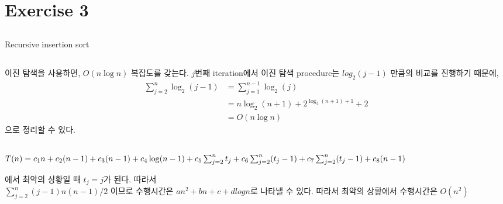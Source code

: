 \documentclass{article}
\begin{document}
\section{Exercise 3}
\subsection{}


\begin{algorithm}
	\caption{Recursive insertion sort}
	\begin{algorithmic}[1]
	     
                
                \EndWhile
            \EndFor
        \EndProcedure
	\end{algorithmic}
\end{algorithm}

\subsection{}
이진 탐색을 사용하면, $O(n \log n)$ 복잡도를 갖는다.
$j$번째 iteration에서 이진 탐색 procedure는 $log_2 (j-1)$ 만큼의 비교를 진행하기 때문에,\\

\begin{equation}
    \begin{split}
        \sum_{j=2}^{n} \log_{2} (j-1) & = \sum_{j=1}^{n-1} \log_{2} (j)\\
     & = n \log_{2} (n+1) + 2^{\log_{2} (n+1) + 1} + 2 \\
     & = O(n \log n)
    \end{split}
\end{equation}
으로 정리할 수 있다.

\subsection{}
$T(n) = c_1 n + c_2 (n-1) + c_3 (n-1) + c_4 \log(n-1) + \\
        c_5 \sum_{j=2}^{n} t_j + c_6 \sum_{j=2}^{n} (t_j-1) + c_7 \sum_{j=2}^{n} (t_j-1) + c_8 (n-1)$
        
에서 최악의 상황일 때 $t_j = j$가 된다. 따라서 \\
$\sum_{j=2}^{n} (j-1) n(n-1)/2$
이므로 수행시간은 $an^{2}+bn+c+d log n$로 나타낼 수 있다.
따라서 최악의 상황에서 수행시간은 $O(n^{2})$
\end{document}
